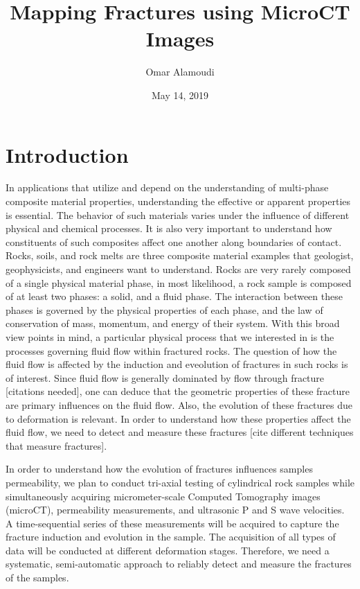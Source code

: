 \documentclass[usletter, 11pt, titlepage]{article}
\title{Mapping Fractures using MicroCT Images}
\author{Omar Alamoudi}
\date{May 14, 2019}
\begin{document}
\maketitle

\section{Introduction}
In applications that utilize and depend on the understanding of multi-phase composite material properties, understanding the effective or apparent properties is essential. The behavior of such materials varies under the influence of different physical and chemical processes. It is also very important to understand how constituents of such composites affect one another along boundaries of contact. Rocks, soils, and rock melts are three composite material examples that geologist, geophysicists, and engineers want to understand. Rocks are very rarely composed of a single physical material phase, in most likelihood, a rock sample is composed of at least two phases: a solid, and a fluid phase. The interaction between these phases is governed by the physical properties of each phase, and the law of conservation of mass, momentum, and energy of their system. With this broad view points in mind, a particular physical process that we interested in is the processes governing fluid flow within fractured rocks. The question of how the fluid flow is affected by the induction and eveolution of fractures in such rocks is of interest. Since fluid flow is generally dominated by flow through fracture [citations needed], one can deduce that the geometric properties of these fracture are primary influences on the fluid flow. Also, the evolution of these fractures due to deformation is relevant. In order to understand how these properties affect the fluid flow, we need to detect and measure these fractures [cite different techniques that measure fractures].

In order to understand how the evolution of fractures influences samples permeability, we plan to conduct tri-axial testing of cylindrical rock samples while simultaneously acquiring micrometer-scale Computed Tomography images (microCT), permeability measurements, and ultrasonic P and S wave velocities. A time-sequential series of these measurements will be acquired to capture the fracture induction and evolution in the sample. The acquisition of all types of data will be conducted at different deformation stages. Therefore, we need a systematic, semi-automatic approach to reliably detect and measure the fractures of the samples. 
\end{document}
